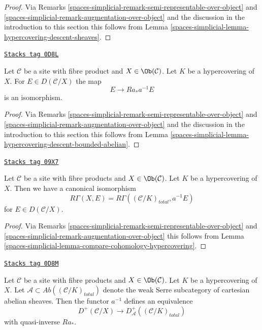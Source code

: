 \begin{proof}
Via Remarks \ref{spaces-simplicial-remark-semi-representable-over-object} and
\ref{spaces-simplicial-remark-augmentation-over-object} and the discussion in
the introduction to this section
this follows from Lemma \ref{spaces-simplicial-lemma-hypercovering-descent-sheaves}.
\end{proof}

\begin{lemma}
\label{spaces-simplicial-lemma-hypercovering-X-descent-bounded-abelian}
\href{https://stacks.math.columbia.edu/tag/0D8L}{\texttt{Stacks tag 0D8L}}

Let $\mathcal{C}$ be a site with fibre product and $X \in \Ob(\mathcal{C})$.
Let $K$ be a hypercovering of $X$. For
$E \in D(\mathcal{C}/X)$ the map
$$
E \longrightarrow Ra_*a^{-1}E
$$
is an isomorphism.
\end{lemma}

\begin{proof}
Via Remarks \ref{spaces-simplicial-remark-semi-representable-over-object} and
\ref{spaces-simplicial-remark-augmentation-over-object} and the discussion in
the introduction to this section
this follows from Lemma \ref{spaces-simplicial-lemma-hypercovering-descent-bounded-abelian}.
\end{proof}

\begin{lemma}
\label{spaces-simplicial-lemma-compare-cohomology-hypercovering-X}
\href{https://stacks.math.columbia.edu/tag/09X7}{\texttt{Stacks tag 09X7}}

Let $\mathcal{C}$ be a site with fibre products and $X \in \Ob(\mathcal{C})$.
Let $K$ be a hypercovering of $X$.
Then we have a canonical isomorphism
$$
R\Gamma(X, E) = R\Gamma((\mathcal{C}/K)_{total}, a^{-1}E)
$$
for $E \in D(\mathcal{C}/X)$.
\end{lemma}

\begin{proof}
Via Remarks \ref{spaces-simplicial-remark-semi-representable-over-object} and
\ref{spaces-simplicial-remark-augmentation-over-object}
this follows from Lemma \ref{spaces-simplicial-lemma-compare-cohomology-hypercovering}.
\end{proof}

\begin{lemma}
\label{spaces-simplicial-lemma-hypercovering-X-equivalence-bounded}
\href{https://stacks.math.columbia.edu/tag/0D8M}{\texttt{Stacks tag 0D8M}}

Let $\mathcal{C}$ be a site with fibre products and $X \in \Ob(\mathcal{C})$.
Let $K$ be a hypercovering of $X$.
Let $\mathcal{A} \subset \textit{Ab}((\mathcal{C}/K)_{total})$
denote the weak Serre subcategory of cartesian abelian sheaves.
Then the functor $a^{-1}$ defines an equivalence
$$
D^+(\mathcal{C}/X) \longrightarrow D_\mathcal{A}^+((\mathcal{C}/K)_{total})
$$
with quasi-inverse $Ra_*$.
\end{lemma}

